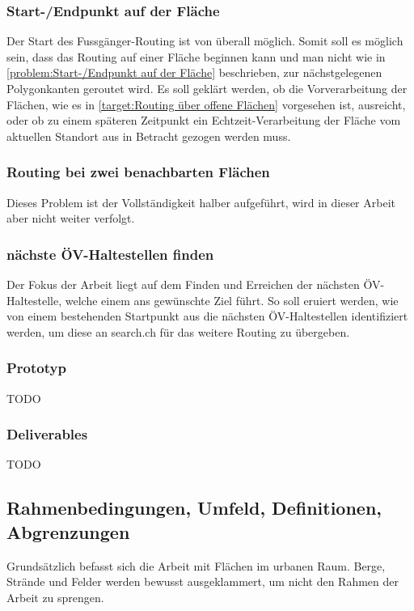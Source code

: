 \subsubsection{Start-/Endpunkt auf der Fläche}
\label{target:Start-/Endpunkt auf der Fläche}
Der Start des Fussgänger-Routing ist von überall möglich. Somit soll es möglich sein, dass das Routing auf einer Fläche beginnen kann und man nicht wie in \ref{problem:Start-/Endpunkt auf der Fläche} beschrieben, zur nächstgelegenen Polygonkanten geroutet wird. Es soll geklärt werden, ob die Vorverarbeitung der Flächen, wie es in \ref{target:Routing über offene Flächen} vorgesehen ist, ausreicht, oder ob zu einem späteren Zeitpunkt ein Echtzeit-Verarbeitung der Fläche vom aktuellen Standort aus in Betracht gezogen werden muss.

\subsubsection{Routing bei zwei benachbarten Flächen}
\label{target:Routing bei zwei benachbarten Flächen}
Dieses Problem ist der Vollständigkeit halber aufgeführt, wird in dieser Arbeit aber nicht weiter verfolgt.

\subsubsection{nächste ÖV-Haltestellen finden}
\label{target:nächste ÖV-Haltestellen finden}
Der Fokus der Arbeit liegt auf dem Finden und Erreichen der nächsten ÖV-Haltestelle, welche einem ans gewünschte Ziel führt. So soll eruiert werden, wie von einem bestehenden Startpunkt aus die nächsten ÖV-Haltestellen identifiziert werden, um diese an search.ch für das weitere Routing zu übergeben.

\subsubsection{Prototyp}
\label{target:Prototyp}

TODO

\subsubsection{Deliverables}
\label{target:Deliverables}

TODO
	
\subsection{Rahmenbedingungen, Umfeld, Definitionen, Abgrenzungen}
\label{Rahmenbedingungen, Umfeld, Definitionen, Abgrenzungen}
Grundsätzlich befasst sich die Arbeit mit Flächen im urbanen Raum. Berge, Strände und Felder werden bewusst ausgeklammert, um nicht den Rahmen der Arbeit zu sprengen.

